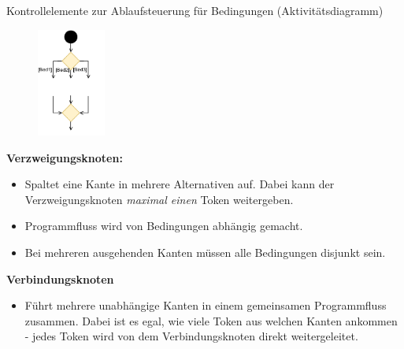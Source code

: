 \begin{defi}{Kontrollelemente zur Ablaufsteuerung für Bedingungen (Aktivitätsdiagramm)}
    \begin{figure}
        \centering
        \includegraphics[width=0.2\textwidth]{includes/figures/defi_diagrams_activity_or.pdf}
    \end{figure}
    \textbf{Verzweigungsknoten:}
    \begin{itemize}
        \item Spaltet eine Kante in mehrere Alternativen auf.
              Dabei kann der Verzweigungsknoten \emph{maximal einen} Token weitergeben.
        \item Programmfluss wird von Bedingungen abhängig gemacht.
        \item Bei mehreren ausgehenden Kanten müssen alle Bedingungen disjunkt sein.
    \end{itemize}

    \textbf{Verbindungsknoten}
    \begin{itemize}
        \item Führt mehrere unabhängige Kanten in einem gemeinsamen Programmfluss zusammen.
              Dabei ist es egal, wie viele Token aus welchen Kanten ankommen - jedes Token wird von dem Verbindungsknoten direkt weitergeleitet.
    \end{itemize}
\end{defi}

